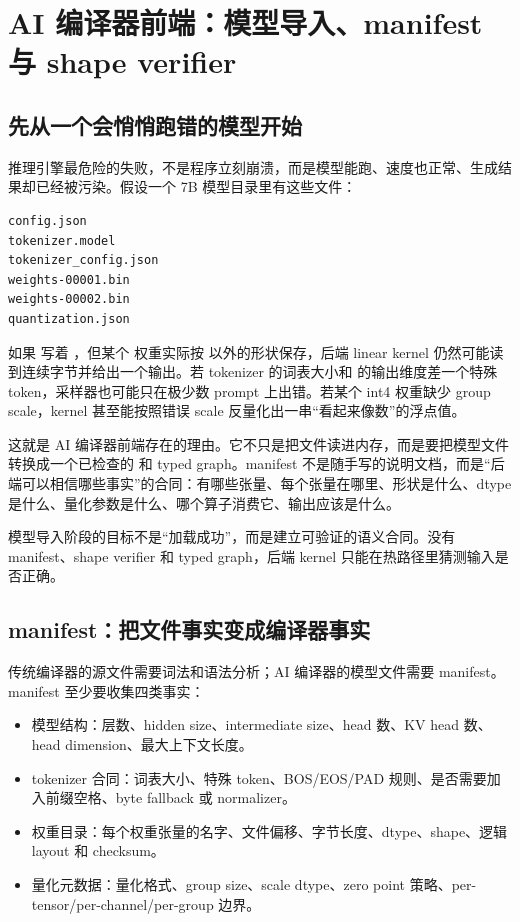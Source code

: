 \section{AI 编译器前端：模型导入、manifest 与 shape verifier}

\subsection{先从一个会悄悄跑错的模型开始}

推理引擎最危险的失败，不是程序立刻崩溃，而是模型能跑、速度也正常、生成结果却已经被污染。假设一个 7B 模型目录里有这些文件：

\begin{lstlisting}[numbers=none,caption={一个本地模型目录的最小文件组}]
config.json
tokenizer.model
tokenizer_config.json
weights-00001.bin
weights-00002.bin
quantization.json
\end{lstlisting}

如果  写着 ，但某个  权重实际按 \code{[4096, 4096]} 以外的形状保存，后端 linear kernel 仍然可能读到连续字节并给出一个输出。若 tokenizer 的词表大小和  的输出维度差一个特殊 token，采样器也可能只在极少数 prompt 上出错。若某个 int4 权重缺少 group scale，kernel 甚至能按照错误 scale 反量化出一串“看起来像数”的浮点值。

这就是 AI 编译器前端存在的理由。它不只是把文件读进内存，而是要把模型文件转换成一个已检查的  和 typed graph。manifest 不是随手写的说明文档，而是“后端可以相信哪些事实”的合同：有哪些张量、每个张量在哪里、形状是什么、dtype 是什么、量化参数是什么、哪个算子消费它、输出应该是什么。

\begin{keyidea}
模型导入阶段的目标不是“加载成功”，而是建立可验证的语义合同。没有 manifest、shape verifier 和 typed graph，后端 kernel 只能在热路径里猜测输入是否正确。
\end{keyidea}

\subsection{manifest：把文件事实变成编译器事实}

传统编译器的源文件需要词法和语法分析；AI 编译器的模型文件需要 manifest。manifest 至少要收集四类事实：

\begin{itemize}
  \item 模型结构：层数、hidden size、intermediate size、head 数、KV head 数、head dimension、最大上下文长度。
  \item tokenizer 合同：词表大小、特殊 token、BOS/EOS/PAD 规则、是否需要加入前缀空格、byte fallback 或 normalizer。
  \item 权重目录：每个权重张量的名字、文件偏移、字节长度、dtype、shape、逻辑 layout 和 checksum。
  \item 量化元数据：量化格式、group size、scale dtype、zero point 策略、per-tensor/per-channel/per-group 边界。
\end{itemize}

